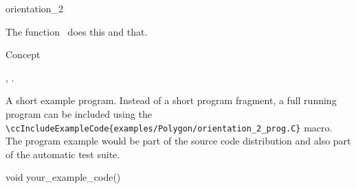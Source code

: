 

\begin{ccRefFunction}{orientation_2}  %


\ccDefinition
  
The function \ccRefName\ does this and that.



\ccIsModel

Concept

\ccSeeAlso

,
.

\ccExample

A short example program.
Instead of a short program fragment, a full running program can be
included using the 
\verb|\ccIncludeExampleCode{examples/Polygon/orientation_2_prog.C}| 
macro. The program example would be part of the source code distribution and
also part of the automatic test suite.

\begin{ccExampleCode}
void your_example_code() {
}
\end{ccExampleCode}


\end{ccRefFunction}


